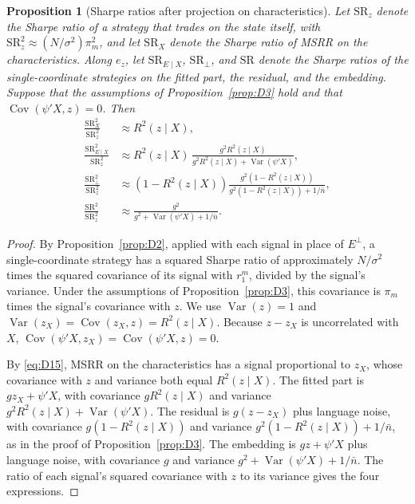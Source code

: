 \documentclass[11pt,letterpaper]{article}
\newtheorem{proposition}{Proposition}
\theoremstyle{remark}
\DeclareMathOperator{\Var}{Var}
\DeclareMathOperator{\Cov}{Cov}
\begin{document}
\begin{proposition}[Sharpe ratios after projection on characteristics]\label{prop:D4}
Let $\mathrm{SR}_z$ denote the Sharpe ratio of a strategy that trades on the state itself, with $\mathrm{SR}_z^2\approx(N/\sigma^2)\pi_m^2$, and let $\mathrm{SR}_X$ denote the Sharpe ratio of MSRR on the characteristics. Along $e_z$, let $\mathrm{SR}_{E\mid X}$, $\mathrm{SR}_\perp$, and $\mathrm{SR}$ denote the Sharpe ratios of the single-coordinate strategies on the fitted part, the residual, and the embedding. Suppose that the assumptions of Proposition~\ref{prop:D3} hold and that $\Cov(\psi'X,z)=0$. Then
\[
\begin{aligned}
\frac{\mathrm{SR}_X^2}{\mathrm{SR}_z^2}
&\approx
R^2(z\mid X),\\
\frac{\mathrm{SR}_{E\mid X}^2}{\mathrm{SR}_z^2}
&\approx
R^2(z\mid X)\,
\frac{g^2R^2(z\mid X)}{g^2R^2(z\mid X)+\Var(\psi'X)},\\
\frac{\mathrm{SR}_\perp^2}{\mathrm{SR}_z^2}
&\approx
\left(1-R^2(z\mid X)\right)
\frac{g^2\left(1-R^2(z\mid X)\right)}{g^2\left(1-R^2(z\mid X)\right)+1/\bar n},\\
\frac{\mathrm{SR}^2}{\mathrm{SR}_z^2}
&\approx
\frac{g^2}{g^2+\Var(\psi'X)+1/\bar n}.
\end{aligned}
\]
\end{proposition}

\begin{proof}
By Proposition~\ref{prop:D2}, applied with each signal in place of $E^\perp$, a single-coordinate strategy has a squared Sharpe ratio of approximately $N/\sigma^2$ times the squared covariance of its signal with $r_1^m$, divided by the signal's variance. Under the assumptions of Proposition~\ref{prop:D3}, this covariance is $\pi_m$ times the signal's covariance with $z$. We use $\Var(z)=1$ and $\Var(z_X)=\Cov(z_X,z)=R^2(z\mid X)$. Because $z-z_X$ is uncorrelated with $X$, $\Cov(\psi'X,z_X)=\Cov(\psi'X,z)=0$.

By \eqref{eq:D15}, MSRR on the characteristics has a signal proportional to $z_X$, whose covariance with $z$ and variance both equal $R^2(z\mid X)$. The fitted part is $gz_X+\psi'X$, with covariance $gR^2(z\mid X)$ and variance $g^2R^2(z\mid X)+\Var(\psi'X)$. The residual is $g(z-z_X)$ plus language noise, with covariance $g(1-R^2(z\mid X))$ and variance $g^2(1-R^2(z\mid X))+1/\bar n$, as in the proof of Proposition~\ref{prop:D3}. The embedding is $gz+\psi'X$ plus language noise, with covariance $g$ and variance $g^2+\Var(\psi'X)+1/\bar n$. The ratio of each signal's squared covariance with $z$ to its variance gives the four expressions.
\end{proof}
\end{document}
